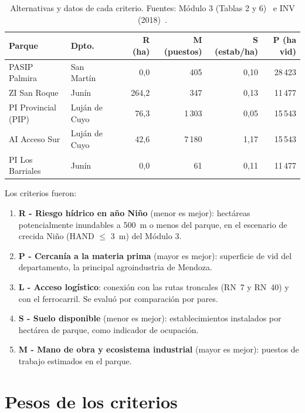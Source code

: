 \documentclass[runningheads]{llncs}
\begin{document}
\begin{table}[H]
\centering
\small
\caption{Alternativas y datos de cada criterio. Fuentes: Módulo 3 (Tablas 2 y 6)~\cite{modulo3} e INV (2018)~\cite{inv2018}.}\label{tab:datos}
\begin{tabular}{lllrrrr}
\toprule
Parque & Dpto. & & R (ha) & M (puestos) & S (estab/ha) & P (ha vid)\\
\midrule
PASIP Palmira & San Martín & & 0,0 & 405 & 0,10 & 28\,423\\
ZI San Roque & Junín & & 264,2 & 347 & 0,13 & 11\,477\\
PI Provincial (PIP) & Luján de Cuyo & & 76,3 & 1\,303 & 0,05 & 15\,543\\
AI Acceso Sur & Luján de Cuyo & & 42,6 & 7\,180 & 1,17 & 15\,543\\
PI Los Barriales & Junín & & 0,0 & 61 & 0,11 & 11\,477\\
\bottomrule
\end{tabular}
\end{table}

Los criterios fueron:
\begin{enumerate}
\item \textbf{R - Riesgo hídrico en año Niño} (menor es mejor): hectáreas potencialmente inundables a 500~m o menos del parque, en el escenario de crecida Niño (HAND $\le$ 3~m) del Módulo 3.
\item \textbf{P - Cercanía a la materia prima} (mayor es mejor): superficie de vid del departamento, la principal agroindustria de Mendoza.
\item \textbf{L - Acceso logístico}: conexión con las rutas troncales (RN~7 y RN~40) y con el ferrocarril. Se evaluó por comparación por pares.
\item \textbf{S - Suelo disponible} (menor es mejor): establecimientos instalados por hectárea de parque, como indicador de ocupación.
\item \textbf{M - Mano de obra y ecosistema industrial} (mayor es mejor): puestos de trabajo estimados en el parque.
\end{enumerate}

\section{Pesos de los criterios}
\end{document}
